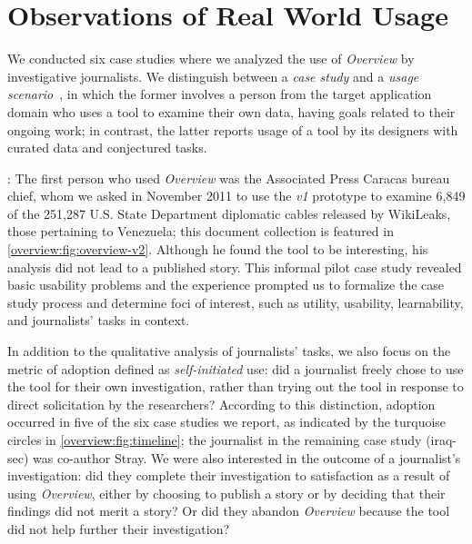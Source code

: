 
\section{Observations of Real World Usage}
\label{overview:usage}


We conducted six case studies where we analyzed the use of {\it Overview} by investigative journalists.
We distinguish between a {\it case study} and a {\it usage scenario}~\cite{Sedlmair2012}, in which the former involves a person from the target application domain who uses a tool to examine their own data, having goals related to their ongoing work; in contrast, the latter reports usage of a tool by its designers with curated data and conjectured tasks.

:
The first person who used {\it Overview} was the Associated Press Caracas bureau chief, whom we asked in November 2011 to use the {\it v1} prototype to examine 6,849 of the 251,287 U.S. State Department diplomatic cables released by WikiLeaks, those pertaining to Venezuela; this document collection is featured in \autoref{overview:fig:overview-v2}.
Although he found the tool to be interesting, his analysis did not lead to a published story.
This informal pilot case study revealed basic usability problems and the experience prompted us to formalize the case study process and determine foci of interest, such as utility, usability, learnability, and journalists' tasks in context.

In addition to the qualitative analysis of journalists' tasks, we also focus on the metric of adoption defined as {\it self-initiated} use: did a journalist freely chose to use the tool for their own investigation, rather than trying out the tool in response to direct solicitation by the researchers?
According to this distinction, adoption occurred in five of the six case studies we report, as indicated by the turquoise circles in \autoref{overview:fig:timeline}; the journalist in the remaining case study ({\sc iraq-sec}) was co-author Stray.
We were also interested in the outcome of a journalist's investigation: did they complete their investigation to satisfaction
as a result of using {\it Overview}, either by choosing to publish a story or by deciding that their findings did not merit a story? Or did they abandon {\it Overview} because the tool did not help further their investigation?

